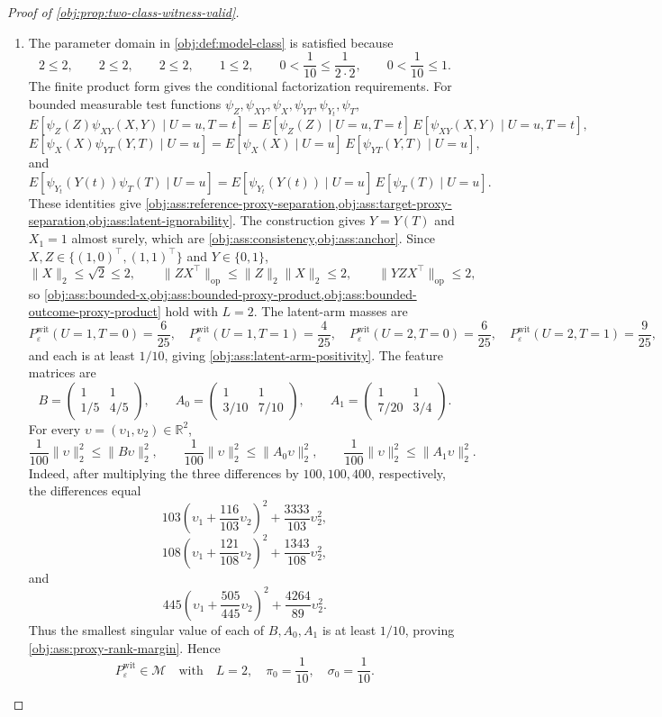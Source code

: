 \documentclass[11pt]{article}
\begin{document}
\begin{proof}[Proof of \cref{obj:prop:two-class-witness-valid}]
\begin{enumerate}
\item The parameter domain in \cref{obj:def:model-class} is satisfied because
\[
2\le 2,\qquad 2\le 2,\qquad 2\le 2,\qquad
1\le 2,\qquad
0<\frac1{10}\le \frac1{2\cdot2},\qquad
0<\frac1{10}\le 1 .
\]
The finite product form gives the conditional factorization requirements.  For bounded measurable
test functions \(\psi_Z,\psi_{XY},\psi_X,\psi_{YT},\psi_{Y_t},\psi_T\),
\[
E[\psi_Z(Z)\psi_{XY}(X,Y)\mid U=u,T=t]
=
E[\psi_Z(Z)\mid U=u,T=t]\,
E[\psi_{XY}(X,Y)\mid U=u,T=t],
\]
\[
E[\psi_X(X)\psi_{YT}(Y,T)\mid U=u]
=
E[\psi_X(X)\mid U=u]\,
E[\psi_{YT}(Y,T)\mid U=u],
\]
and
\[
E[\psi_{Y_t}(Y(t))\psi_T(T)\mid U=u]
=
E[\psi_{Y_t}(Y(t))\mid U=u]\,
E[\psi_T(T)\mid U=u].
\]
These identities give \cref{obj:ass:reference-proxy-separation,obj:ass:target-proxy-separation,obj:ass:latent-ignorability}.  The construction gives \(Y=Y(T)\) and \(X_1=1\) almost surely, which are \cref{obj:ass:consistency,obj:ass:anchor}.  Since \(X,Z\in\{(1,0)^\top,(1,1)^\top\}\) and \(Y\in\{0,1\}\),
\[
\|X\|_2\le \sqrt2\le 2,\qquad
\|ZX^\top\|_{\mathrm{op}}\le \|Z\|_2\|X\|_2\le 2,\qquad
\|YZX^\top\|_{\mathrm{op}}\le 2,
\]
so \cref{obj:ass:bounded-x,obj:ass:bounded-proxy-product,obj:ass:bounded-outcome-proxy-product} hold with \(L=2\).  The latent-arm masses are
\[
P_{\varepsilon}^{\mathrm{wit}}(U=1,T=0)=\frac6{25},\quad
P_{\varepsilon}^{\mathrm{wit}}(U=1,T=1)=\frac4{25},\quad
P_{\varepsilon}^{\mathrm{wit}}(U=2,T=0)=\frac6{25},\quad
P_{\varepsilon}^{\mathrm{wit}}(U=2,T=1)=\frac9{25},
\]
and each is at least \(1/10\), giving \cref{obj:ass:latent-arm-positivity}.  The feature matrices are
\[
B=\begin{pmatrix}1&1\\[2pt]1/5&4/5\end{pmatrix},\qquad
A_0=\begin{pmatrix}1&1\\[2pt]3/10&7/10\end{pmatrix},\qquad
A_1=\begin{pmatrix}1&1\\[2pt]7/20&3/4\end{pmatrix}.
\]
For every \(\upsilon=(\upsilon_1,\upsilon_2)\in\mathbb R^2\),
\[
\frac1{100}\|\upsilon\|_2^2\le \|B\upsilon\|_2^2,\qquad
\frac1{100}\|\upsilon\|_2^2\le \|A_0\upsilon\|_2^2,\qquad
\frac1{100}\|\upsilon\|_2^2\le \|A_1\upsilon\|_2^2.
\]
Indeed, after multiplying the three differences by \(100,100,400\), respectively, the differences equal
\[
103\left(\upsilon_1+\frac{116}{103}\upsilon_2\right)^2
+\frac{3333}{103}\upsilon_2^2,
\]
\[
108\left(\upsilon_1+\frac{121}{108}\upsilon_2\right)^2
+\frac{1343}{108}\upsilon_2^2,
\]
and
\[
445\left(\upsilon_1+\frac{505}{445}\upsilon_2\right)^2
+\frac{4264}{89}\upsilon_2^2.
\]
Thus the smallest singular value of each of \(B,A_0,A_1\) is at least \(1/10\), proving \cref{obj:ass:proxy-rank-margin}.  Hence
\[
P_{\varepsilon}^{\mathrm{wit}}\in\mathcal M
\quad\text{with}\quad
L=2,\quad \pi_0=\frac1{10},\quad \sigma_0=\frac1{10}.
\] %


\end{enumerate}
\end{proof}
\end{document}

